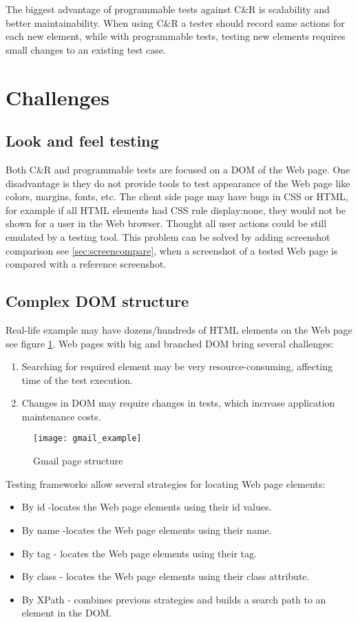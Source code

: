 The biggest advantage of programmable tests against C\&R is scalability and
better maintainability. When using C\&R a tester should record same actions for
each new element, while with  programmable tests, testing new elements requires
small changes to an existing test case. 

\section {Challenges}
	\label {sec:challenges}
	\subsection{Look and feel testing}
	    Both C\&R and programmable tests are focused on a DOM of the Web page.
	    One disadvantage is they do not provide tools to test appearance of the Web
	    page like colors, margins, fonts, etc. The client side page may have bugs in CSS
	    or HTML, for example if all HTML elements had CSS rule display:none, they
	    would not be shown for a user in the Web browser. Thought all user actions
	    could be still emulated by a testing tool. This problem can be solved by adding screenshot
      comparison see \ref{sec:screencompare}, when a screenshot of a tested Web
      page is compared with a reference screenshot. 
	\subsection{Complex DOM structure}
    Real-life example may have dozens/hundreds of HTML
		elements on the Web page see figure
		\ref{fig:gmailexample}.
		Web pages with big and branched DOM bring several challenges:
		\begin{enumerate}
		  \item Searching for required element may be very resource-consuming,
		  affecting time of the test execution. 
		  \item Changes in DOM may require changes in tests, which increase
		  application maintenance costs.
		\end{enumerate}
		
		\begin{figure}
		\centering
		  \texttt{[image: gmail\_example]}
		  \caption{Gmail page structure}
		  \label{fig:gmailexample}
		\end{figure}
		
		Testing frameworks allow several strategies for locating Web page elements:
		\begin{itemize}
		  \item By id -locates the Web page elements using their id values.
		  \item By name -locates the Web page elements using their name.
		  \item By tag - locates the Web page elements using their tag.
		  \item By class - locates the Web page elements using their class attribute.
		  \item By XPath - combines previous strategies and builds a search
		  path to an element in the DOM.
		\end{itemize}
		
